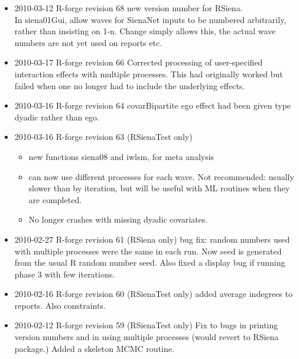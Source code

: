 \documentclass[a4paper,fleqn,11pt]{article}
\newcommand{\+}{\, + \,}
\newcommand{\sfn}[1]{\textsf{#1}}
\newcommand{\R}{{\sf R }}
\begin{document}
{\begin{small}
\begin{itemize}
\begin{itemize}
\item New features and bug fixes as for revision 63 in RSienaTest.
\item 4-cycles effect has new shortName: cycle4.
\item some percentages on reports were proportions not percentages
\item Sped up treatment of missing values in sparse format networks.
\item Fix: now allows more than one value to indicate missing in covariates.
\end{itemize}
\item 2010-03-12 R-forge revision 68 new version number for RSiena.\\
In \sfn{siena01Gui}, allow waves for SienaNet inputs to be numbered
arbitrarily, rather than insisting on 1-n. Change simply allows this, the actual
wave numbers are not yet used on reports etc.
\item 2010-03-17 R-forge revision 66
Corrected processing of user-specified interaction effects with multiple
processes. This had originally worked but failed when one no longer had to
include the underlying effects.
\item 2010-03-16 R-forge revision 64
covarBipartite ego effect had been given type dyadic rather than ego.
\item 2010-03-16 R-forge revision 63 (RSienaTest only)
\begin{itemize}
\item new functions \sfn{siena08} and \sfn{iwlsm}, for meta analysis
\item can now use different processes for each wave. Not recommended: usually
  slower than by iteration, but will be useful with ML routines when they are
  completed.
\item No longer crashes with missing dyadic covariates.
\end{itemize}
\item 2010-02-27 R-forge revision 61 (RSiena only) bug fix: random numbers used
  with multiple processes were the same in each run. Now seed is generated
  from the usual \R random number seed. Also fixed a display bug if running
  phase 3 with few iterations.
\item 2010-02-16 R-forge revision 60 (RSienaTest only) added average indegrees
  to reports. Also constraints.
\item 2010-02-12 R-forge revision 59 (RSienaTest only) Fix to bugs in printing
  version numbers and in using multiple processes (would revert to RSiena
  package.) Added a skeleton MCMC routine.

\end{itemize}
\end{small}}
\end{document}
